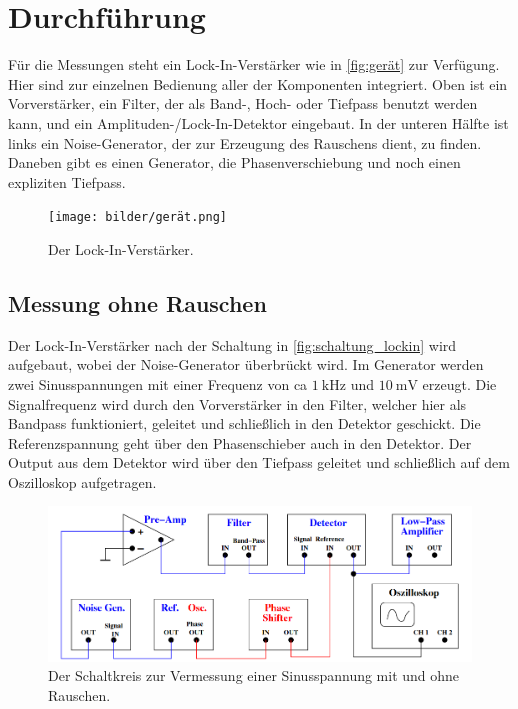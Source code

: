 \section{Durchführung}
\label{sec:Durchführung}

    Für die Messungen steht ein Lock-In-Verstärker wie in \autoref{fig:gerät} zur Verfügung. Hier sind zur einzelnen Bedienung aller der 
    Komponenten integriert. Oben ist ein Vorverstärker, ein Filter, der als Band-, Hoch- oder Tiefpass benutzt werden kann, und ein 
    Amplituden-/Lock-In-Detektor eingebaut. In der unteren Hälfte ist links ein Noise-Generator, der zur Erzeugung des Rauschens dient, zu finden.
    Daneben gibt es einen Generator, die Phasenverschiebung und noch einen expliziten Tiefpass.

    \begin{figure}
        \centering
        \texttt{[image: bilder/gerät.png]}
        \caption{Der Lock-In-Verstärker. \cite{anleitung}}
        \label{fig:gerät}
    \end{figure}

\subsection{Messung ohne Rauschen}

    Der Lock-In-Verstärker nach der Schaltung in \autoref{fig:schaltung_lockin} wird aufgebaut, wobei der Noise-Generator überbrückt wird. 
    Im Generator werden zwei Sinusspannungen mit einer Frequenz von ca $\SI{1}{\kilo\hertz}$ und $\SI{10}{\milli\volt}$ erzeugt. Die 
    Signalfrequenz wird durch den Vorverstärker in den Filter, welcher hier als Bandpass funktioniert, geleitet und schließlich in den 
    Detektor geschickt. Die Referenzspannung geht über den Phasenschieber auch in den Detektor. Der Output aus dem Detektor wird über
    den Tiefpass geleitet und schließlich auf dem Oszilloskop aufgetragen.

    \begin{figure}
        \centering
        \includegraphics[width=\textwidth]{bilder/schaltkreis_lock_in.png}
        \caption{Der Schaltkreis zur Vermessung einer Sinusspannung mit und ohne Rauschen. \cite{anleitung}}
        \label{fig:schaltung_lockin}
    \end{figure}

